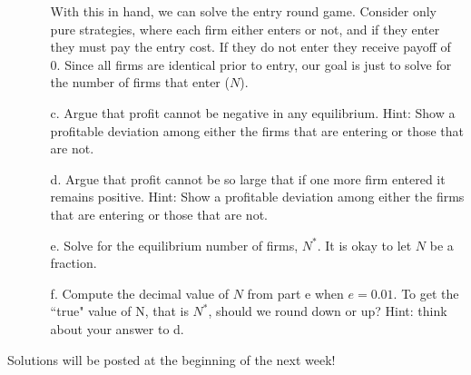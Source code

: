 \documentclass{article}
\begin{document}
\begin{enumerate}
\begin{enumerate}
        \vspace{4cm}
    
   With this in hand, we can solve the entry round game. Consider only pure strategies, where each firm either enters or not, and if they enter they must pay the entry cost. If they do not enter they receive payoff of 0. Since all firms are identical prior to entry, our goal is just to solve for the number of firms that enter ($N$).
   
        \item[c.] Argue that profit cannot be negative in any equilibrium. Hint: Show a profitable deviation among either the firms that are entering or those that are not.
        
        \vspace{4cm}
        
        \item[d.] Argue that profit cannot be so large that if one more firm entered it remains positive. Hint: Show a profitable deviation among either the firms that are entering or those that are not.
        
        \vspace{4cm}
        
        \item[e.] Solve for the equilibrium number of firms, $N^*$. It is okay to let $N$ be a fraction.
        
        \vspace{4cm}
        
        \item[f.] Compute the decimal value of $N$ from part e when $e=0.01$. To get the ``true" value of N, that is $N^*$, should we round down or up? Hint: think about your answer to d.
        
        
        \vspace{4cm}
        
    \end{enumerate}
\end{enumerate}
Solutions will be posted at the beginning of the next week!
\end{document}
